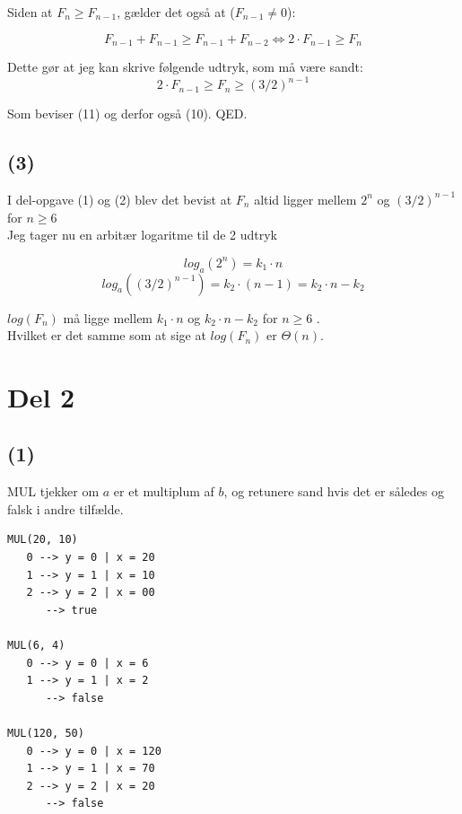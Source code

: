 \documentclass[12pt, a4paper, hidelinks]{article}
\begin{document}
Siden at $F_n \geq F_{n-1}$, gælder det også at ($F_ {n-1} \neq 0$):

\begin{equation}  F_ {n-1} + F_ {n-1} \geq F_ {n-1} + F_ {n-2} \iff 2 \cdot F_ {n-1} \geq F_n  \end{equation}

Dette gør at jeg kan skrive følgende udtryk, som må være sandt:
\begin{equation} 2 \cdot F_ {n-1} \geq F_n  \geq  (3/2)^{n - 1} \end{equation}

Som beviser (11) og derfor også (10). QED.

\subsection{(3)}

I del-opgave (1) og (2) blev det bevist at $F_n$ altid ligger mellem $ 2^n$ og $ (3/2)^{n-1} $ for $ n \geq 6 $ \\

Jeg tager nu en arbitær logaritme til de 2 udtryk

\begin{equation}
log_a (2^n) = k_1 \cdot n
\end{equation}
\begin{equation}
log_a ((3/2)^{n-1}) = k_2 \cdot (n - 1) = k_2 \cdot n - k_2
\end{equation}

$log (F_n)$ må ligge mellem $k_1 \cdot n$ og $ k_2 \cdot n - k_2$ for $ n \geq 6 $ .\\

Hvilket er det samme som at sige at $log (F_n)$ er   $\Theta (n) $.


\section {Del 2}
\subsection{(1)}
MUL tjekker om $a$ er et multiplum af $b$, og retunere sand hvis det er således og falsk i andre tilfælde.

\begin{lstlisting}
MUL(20, 10)
   0 --> y = 0 | x = 20
   1 --> y = 1 | x = 10
   2 --> y = 2 | x = 00
      --> true 

MUL(6, 4)
   0 --> y = 0 | x = 6
   1 --> y = 1 | x = 2
      --> false

MUL(120, 50)
   0 --> y = 0 | x = 120
   1 --> y = 1 | x = 70
   2 --> y = 2 | x = 20
      --> false  
\end{lstlisting}
\end{document}
